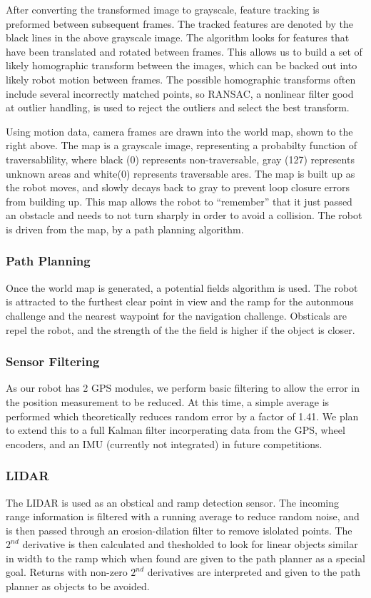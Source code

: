 After converting the transformed image to grayscale, feature tracking is preformed between subsequent frames. The tracked features are denoted by the black lines in the above grayscale image. The algorithm looks for features that have been translated and rotated between frames. This allows us to build a set of likely homographic transform between the images, which can be backed out into likely robot motion between frames. The possible homographic transforms often include several incorrectly matched points, so RANSAC, a nonlinear filter good at outlier handling, is used to reject the outliers and select the best transform.

Using motion data, camera frames are drawn into the world map, shown to the right above. The map is a grayscale image, representing a probabilty function of traversablility, where black (0) represents non-traversable, gray (127) represents unknown areas and white(0) represents traversable ares. The map is built up as the robot moves, and slowly decays back to gray to prevent loop closure errors from building up. This map allows the robot to “remember” that it just passed an obstacle and needs to not turn sharply in order to avoid a collision. The robot is driven from the map, by a path planning algorithm.

\subsubsection{Path Planning}

Once the world map is generated, a potential fields algorithm is used. The robot is attracted to the furthest clear point in view and the ramp for the autonmous challenge and the nearest waypoint for the navigation challenge. Obsticals are repel the robot, and the strength of the the field is higher if the object is closer.

\subsubsection{Sensor Filtering}

As our robot has 2 GPS modules, we perform basic filtering to allow the error in the position measurement to be reduced. At this time, a simple average is performed which theoretically reduces random error by a factor of 1.41. We plan to extend this to a full Kalman filter incorperating data from the GPS, wheel encoders, and an IMU (currently not integrated) in future competitions.

\subsubsection{LIDAR}

The LIDAR is used as an obstical and ramp detection sensor. The incoming range information is filtered with a running average to reduce random noise, and is then passed through an erosion-dilation filter to remove islolated points. The $2^{nd}$ derivative is then calculated and thesholded to look for linear objects similar in width to the ramp which when found are given to the path planner as a special goal. Returns with non-zero $2^{nd}$ derivatives are interpreted and given to the path planner as objects to be avoided.